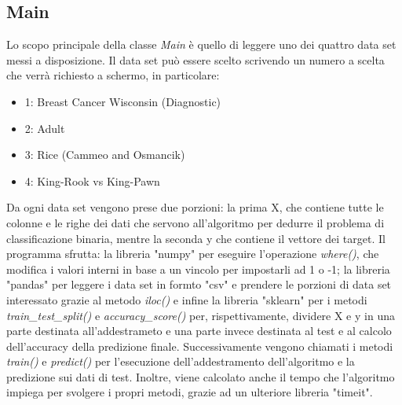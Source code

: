 \documentclass{article}
\begin{document}
    \subsection{Main}
	Lo scopo principale della classe \textit{Main} è quello di leggere uno dei quattro data set messi a disposizione. 
	Il data set può essere scelto scrivendo un numero a scelta che verrà richiesto a schermo, in particolare:
	\begin{itemize}
		\item 1: Breast Cancer Wisconsin (Diagnostic)
		\item 2: Adult
		\item 3: Rice (Cammeo and Osmancik)
		\item 4: King-Rook vs King-Pawn
	\end{itemize}
    Da ogni data set vengono prese due porzioni: la prima X, che contiene tutte le colonne e le righe dei dati che servono all'algoritmo per dedurre il problema di classificazione binaria, mentre la seconda y che contiene il vettore dei target. Il programma sfrutta: la libreria "numpy" per eseguire l'operazione \textit{where()}, che modifica i valori interni in base a un vincolo per impostarli ad 1 o -1; la libreria "pandas" per leggere i data set in formto "csv" e prendere le porzioni di data set interessato grazie al metodo \textit{iloc()} e infine la libreria "sklearn" per i metodi \textit{train\_test\_split()} e \textit{accuracy\_score()} per, rispettivamente, dividere X e y in una parte destinata all'addestrameto e una parte invece destinata al test e al calcolo dell'accuracy della predizione finale.
	Successivamente vengono chiamati i metodi \textit{train()} e \textit{predict()} per l'esecuzione dell'addestramento dell'algoritmo e la predizione sui dati di test. Inoltre, viene calcolato anche il tempo che l'algoritmo impiega per svolgere i propri metodi, grazie ad un ulteriore libreria "timeit".
\end{document}
